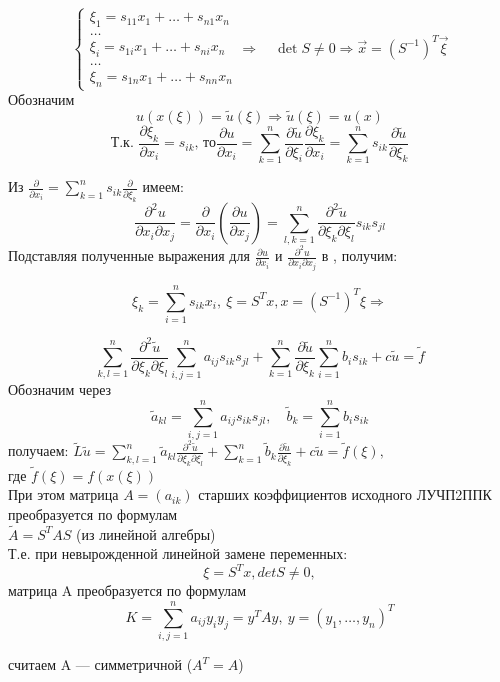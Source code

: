 \[
	\begin{cases}
		\xi_1 = s_{11}x_1 + \ldots + s_{n1}x_n \\
		\ldots                                 \\
		\xi_i = s_{1i}x_1 + \ldots + s_{ni}x_n \\
		\ldots                                 \\
		\xi_n = s_{1n}x_1 + \ldots + s_{nn}x_n
	\end{cases}\Longrightarrow
	\quad \det S \neq 0 \Longrightarrow \vec x=(S^{-1})^T\vec\xi
\]
Обозначим
\[
	u(x(\xi))=\tilde{u}(\xi) \Rightarrow \tilde{u}(\xi)=u(x)\]
\[
	\text{Т.к. } \frac{\partial \xi_k}{\partial x_i} = s_{ik} \text{, то} \frac{\partial u}{\partial x_i} = \sum_{k=1}^n\frac{\partial \tilde{u}}{\partial \xi_i}\frac{\partial \xi_k}{\partial x_i} = \sum_{k=1}^ns_{ik}\frac{\partial \tilde{u}}{\partial \xi_k}
\]

\begin{note}
	Из $\displaystyle\frac{\partial }{\partial x_i} = \sum_{k=1}^n s_{ik}\frac{\partial}{\partial \xi_k}$ имеем:
	\[\frac{\partial^2u}{\partial x_i \partial x_j}=\frac{\partial}{\partial x_i}(\frac{\partial u}{\partial x_j})=\sum_{l,k=1}^{n}\frac{\partial^2 \tilde{u}}{\partial\xi_k \partial\xi_l}s_{ik}s_{jl}\]
	Подставляя полученные выражения для $\frac{\partial u}{\partial x_i}$ и $\frac{\partial^2 u}{\partial x_i \partial x_j}$ в \LDUChPSPPK{}, получим:

	\[\xi_k=\sum_{i=1}^{n}s_{ik}x_i,\ \xi=S^Tx, x=(S^{-1})^T\xi\Rightarrow\]

	\[
		\sum_{k,l=1}^n \frac{\partial^2 \tilde{u}}{\partial \xi_k \partial \xi_l} \sum_{i,j=1}^n a_{ij}s_{ik}s_{jl} + \sum_{k=1}^n \frac{\partial \tilde{u}}{\partial \xi_k}\sum_{i=1}^nb_is_{ik}+c\tilde{u}=\tilde{f}
	\]
	Обозначим через
	\[\tilde{a}_{kl}=\sum_{i,j=1}^na_{ij}s_{ik}s_{jl}, \quad\tilde{b}_k=\sum_{i=1}^nb_is_{ik}\]
	получаем:
	$\displaystyle
		\tilde{L}\tilde{u}=\sum_{k,l=1}^n\tilde{a}_{kl}\frac{\partial^2\tilde{u}}{\partial\xi_k\partial\xi_l}+\sum_{k=1}^n\tilde{b}_k\frac{\partial\tilde{u}}{\partial\xi_k}+c\tilde{u}=\tilde{f}(\xi),
	$\\
	где $\tilde{f}(\xi)=f(x(\xi))$\\
	При этом матрица $A=(a_{ik})$ старших коэффициентов исходного ЛУЧП2ППК преобразуется по формулам\\
	$
		\displaystyle
		\tilde{A}=S^TAS
	$
	(из линейной алгебры)\\
	Т.е. при невырожденной линейной замене переменных:
	\[
		\xi=S^Tx, detS\ne0,
	\] матрица A преобразуется по формулам
	\[
		K=\sum_{i,j=1}^na_{ij}y_iy_j=y^TAy,\ y=(y_1, \ldots, y_n)^T
	\]
\end{note}

\begin{note}
	считаем A --- симметричной ($A^T=A$)
\end{note}
